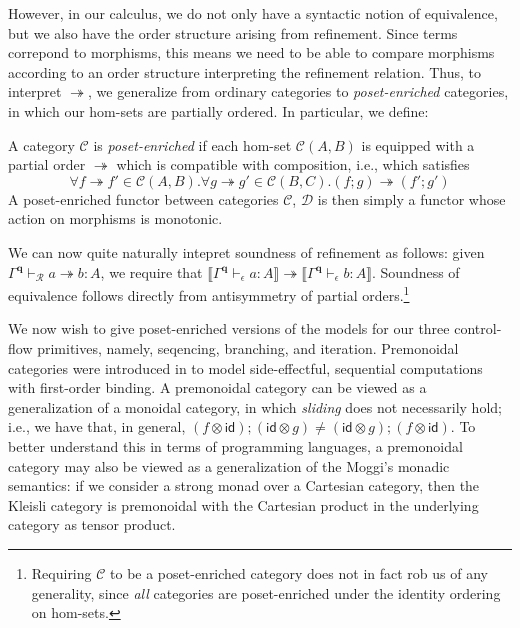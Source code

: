 \documentclass[acmsmall,screen,review]{acmart}
\newcommand{\mc}[1]{\ensuremath{\mathcal{#1}}}
\newcommand{\mb}[1]{\ensuremath{\mathbf{#1}}}
\newcommand{\ms}[1]{\ensuremath{\mathsf{#1}}}
\newcommand{\hasty}[4]{#1 \vdash_{#2} #3: {#4}}
\newcommand{\tref}{\twoheadrightarrow}
\newcommand{\cref}{\twoheadrightarrow}
\newcommand{\tmle}[5]{#1 \vdash_{#2} #3 \tref #4 : {#5}}
\newcommand{\dnt}[1]{\llbracket{#1}\rrbracket}
\begin{document}
However, in our calculus, we do not only have a syntactic notion of equivalence, but we also have
the order structure arising from refinement. Since terms correpond to morphisms, this means we need
to be able to compare morphisms according to an order structure interpreting the refinement
relation. Thus, to interpret $\tref$, we generalize from ordinary categories to
\emph{poset-enriched} categories, in which our hom-sets are partially ordered. In particular, we
define:

\begin{definition}
  A category $\mc{C}$ is \emph{poset-enriched} if each hom-set $\mc{C}(A, B)$ is equipped with a
  partial order $\cref$ which is compatible with composition, i.e., which satisfies
  $$
  \forall f \cref f' \in \mc{C}(A, B) . \forall g \tref g' \in \mc{C}(B, C) . 
    (f ; g) \tref (f' ; g')
  $$
  A poset-enriched functor between categories $\mc{C}$, $\mc{D}$ is then simply a functor whose
  action on morphisms is monotonic.
\end{definition}

We can now quite naturally intepret soundness of refinement as follows: given
$\tmle{\Gamma^{\mb{q}}}{\mc{R}}{a}{b}{A}$, we require that
$\dnt{\hasty{\Gamma^{\mb{q}}}{\epsilon}{a}{A}} \cref \dnt{\hasty{\Gamma^{\mb{q}}}{\epsilon}{b}{A}}$.
Soundness of equivalence follows directly from antisymmetry of partial orders.\footnote{Requiring
$\mc{C}$ to be a poset-enriched category does not in fact rob us of any generality, since \emph{all}
categories are poset-enriched under the identity ordering on hom-sets.}

We now wish to give poset-enriched versions of the models for our three control-flow primitives,
namely, seqencing, branching, and iteration. Premonoidal categories were introduced in
\citet{power-premonoidal-97} to model side-effectful, sequential computations with first-order
binding. A premonoidal category can be viewed as a generalization of a monoidal category, in which
\emph{sliding} does not necessarily hold; i.e., we have that, in general,
$
(f \otimes \ms{id}) ; (\ms{id} \otimes g) \neq
(\ms{id} \otimes g) ; (f \otimes \ms{id})
$.
To better understand this in terms of programming languages, a premonoidal category may also be
viewed as a generalization of the Moggi's \cite{moggi-91-monad} monadic semantics: if we consider a
strong monad over a Cartesian category, then the Kleisli category is premonoidal with the Cartesian
product in the underlying category as tensor product. 
\end{document}

